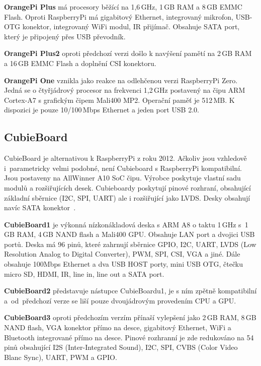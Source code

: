 		\textbf{OrangePi Plus } má procesory běžící na 1,6\,GHz, 1\,GB RAM a 8\,GB EMMC Flash. Oproti RaspberryPi má gigabitový Ethernet, integrovaný mikrofon, USB-OTG konektor, integrovaný WiFi modul, IR přijímač. Obsahuje SATA port, který je připojený přes USB převodník.
		
		\textbf{OrangePi Plus2} oproti předchozí verzi došlo k navýšení pamětí na 2\,GB RAM a 16\,GB EMMC Flash a doplnění CSI konektoru.
		
		\textbf{OrangePi One} vznikla jako reakce na odlehčenou verzi RaspberryPi Zero. Jedná se o čtyřjádrový procesor na frekvenci 1,2\,GHz postavený na čipu ARM Cortex-A7 s grafickým čipem Mali400 MP2. Operační paměť je 512\,MB. K dispozici je pouze 10/100\,Mbps Ethernet a jeden port USB 2.0.


	\subsection{CubieBoard}
	\label{KapCubie}
			CubieBoard je alternativou k RaspberryPi z roku 2012. Ačkoliv jsou vzhledově i~parametricky velmi podobné, není Cubieboard s RaspberryPi kompatibilní. Jsou postaveny na AllWinner A10 SoC čipu. Výrobce poskytuje vlastní sadu modulů a rozšiřujících desek. Cubieboardy poskytují pinové rozhraní, obsahující základní sběrnice (I2C, SPI, UART) ale i rozšiřující jako LVDS. Desky obsahují navíc SATA konektor~\cite{CubieBoards}.
	
	\textbf{CubieBoard1} je výkonná nízkonákladová deska s ARM A8 o taktu 1\,GHz s~1\,GB RAM, 4\,GB NAND flash a Mali400 GPU. Obsahuje LAN port a dvojici USB portů. Deska má 96 pinů, které zahrnují sběrnice GPIO, I2C, UART, LVDS (Low Resolution Analog to Digital Converter), PWM, SPI, CSI, VGA a jiné. Dále obsahuje 100Mbps Ethernet a dva USB HOST porty, mini USB OTG, čtečku micro SD, HDMI, IR, line in, line out a SATA port.
	
	\textbf{CubieBoard2} představuje nástupce CubieBoardu1, je s ním zpětně kompatibilní a~od~předchozí verze se liší pouze dvoujádrovým provedením CPU a GPU.
		
	\textbf{CubieBoard3} oproti předchozím verzím přínaší vylepšení jako 2\,GB RAM, 8\,GB NAND flash, VGA konektor přímo na desce, gigabitový Ethernet, WiFi a Bluetooth integrované přímo na desce. Pinové rozhranní je zde redukováno na 54 pinů obsahující I2S (Inter-Integrated Sound), I2C, SPI, CVBS (Color Video Blanc Sync), UART, PWM a GPIO.
	
